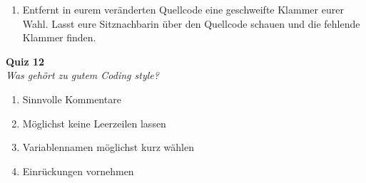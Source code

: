 \begin{spiel}
    \begin{enumerate}
        \item Entfernt in eurem veränderten Quellcode eine geschweifte Klammer
              eurer Wahl. Lasst eure Sitznachbarin über den Quellcode schauen und die
              fehlende Klammer finden.
    \end{enumerate}
\end{spiel}

\textbf{Quiz 12}\\
\textit{Was gehört zu gutem Coding style?}
\begin{enumerate}[label=\alph]
    \item Sinnvolle Kommentare
    \item Möglichst keine Leerzeilen lassen
    \item Variablennamen möglichst kurz wählen
    \item Einrückungen vornehmen
\end{enumerate}
